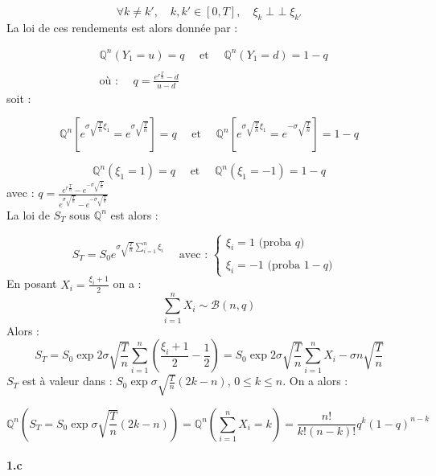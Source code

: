 \documentclass[a4paper,10pt]{report}
\DeclareMathOperator{\ind}{\perp \!\!\! \perp} %
\begin{document}
$$
\forall k \neq k', \quad k, k' \in [0,T], \quad \xi_{k} \ind \xi_{k'}
$$
La loi de ces rendements est alors donnée par :

$$
\begin{aligned} 
& \mathbb{Q}^n\left(Y_{1}=u\right)=q \quad \text { et } \quad \mathbb{Q}^n\left(Y_{1}=d\right)=1-q \\
& \\
&\mbox{où : } \quad q=\frac{e^{r \frac{T}{n}}-d}{u-d}
\end{aligned}
$$
soit :

$$
\mathbb{Q}^n\left[ e^{\sigma  \sqrt{\frac{T}{n}}  \xi_{1}} = e^{\sigma \sqrt{\frac{T}{n}}}\right] = q 
\quad \text { et } \quad
\mathbb{Q}^n\left[e^{\sigma \sqrt{\frac{T}{n}} \xi_{1}} = e^{- \sigma \sqrt{\frac{T}{n}}} \right]=1- q
$$

$$
\mathbb{Q}^n \left( \xi_{1} = 1 \right) = q 
\quad \text { et } \quad
\mathbb{Q}^n \left( \xi_{1} = - 1 \right)=1- q
$$
avec : $q = \frac{e^{r \frac{T}{n}} - e^{- \sigma \sqrt{\frac{T}{n}}} }{e^{\sigma \sqrt{\frac{T}{n}}} - e^{- \sigma \sqrt{\frac{T}{n}}} }$ \\

La loi de $S_T$ sous $\mathbb{Q}^n$ est alors :

$$
S_T = S_0 e^{\sigma \sqrt{\frac{T}{n}} \sum_{i = 1}^n \xi_i} \quad \mbox{ avec : } \left\{
\begin{array}{ll}
\xi_i = 1 \mbox{    (proba } q \mbox{)}\\
 & \\
\xi_i = -1 \mbox{    (proba } 1 - q \mbox{)}
    \end{array}
\right.
$$
En posant $X_i = \frac{\xi_i +1}{2}$ on a :
$$
\sum_{i = 1}^n X_i \sim \mathcal{B}(n,q)
$$
Alors :
$$
S_T = S_0 \exp{ 2 \sigma \sqrt{\frac{T}{n}} \sum_{i = 1}^n \left(  \frac{\xi_i +1}{2} - \frac{1}{2} \right) } = S_0 \exp{ 2 \sigma \sqrt{\frac{T}{n}} \sum_{i = 1}^n  X_i - \sigma n \sqrt{\frac{T}{n}} }
$$
$S_T$ est à valeur dans : $S_0 \exp{\sigma \sqrt{\frac{T}{n}} (2k - n)}$, $0 \leq k \leq n$. On a alors :

$$
\mathbb{Q}^n \left( S_T = S_0 \exp{\sigma \sqrt{\frac{T}{n}} (2k - n)} \right) = \mathbb{Q}^n \left( \sum_{i = 1}^n  X_i = k \right) = \frac{n!}{k!(n-k)!}q^k (1-q)^{n-k}
$$


\paragraph*{1.c} 
\end{document}
